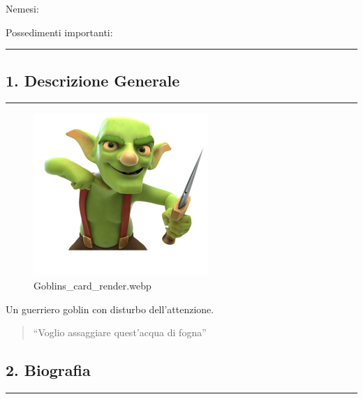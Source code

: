 Nemesi:

Possedimenti importanti:

\begin{center}\rule{0.5\linewidth}{0.5pt}\end{center}

\subsection{1. Descrizione Generale}\label{descrizione-generale}

\begin{center}\rule{0.5\linewidth}{0.5pt}\end{center}

\begin{figure}
\centering
\includegraphics{Goblins_card_render.webp}
\caption{Goblins\_card\_render.webp}
\end{figure}

Un guerriero goblin con disturbo dell'attenzione.

\begin{quote}
``Voglio assaggiare quest'acqua di fogna''
\end{quote}

\subsection{2. Biografia}\label{biografia}

\begin{center}\rule{0.5\linewidth}{0.5pt}\end{center}

